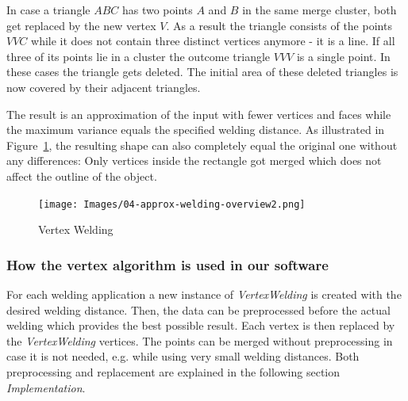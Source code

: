 \documentclass[../ClassicThesis.tex]{subfiles}
\begin{document}
In case a triangle $ABC$ has two points $A$ and $B$ in the same merge cluster, both get replaced by the new vertex $V$. As a result the triangle consists of the points $VVC$ while it does not contain three distinct vertices anymore - it is a line. If all three of its points lie in a cluster the outcome triangle $VVV$ is a single point. In these cases the triangle gets deleted. The initial area of these deleted triangles is now covered by their adjacent triangles.

The result is an approximation of the input with fewer vertices and faces while the maximum variance equals the specified welding distance. As illustrated in Figure~\ref{fig:vertex_welding}, the resulting shape can also completely equal the original one without any differences: Only vertices inside the rectangle got merged which does not affect the outline of the object.



\begin{figure}
\texttt{[image: Images/04-approx-welding-overview2.png]}
\caption{Vertex Welding}
\label{fig:vertex_welding}
\end{figure}

\subsubsection{How the vertex algorithm is used in our software}

For each welding application a new instance of \emph{VertexWelding} is created with the desired welding distance. Then, the data can be preprocessed before the actual welding which provides the best possible result. Each vertex is then replaced by the \emph{VertexWelding} vertices. The points can be merged without preprocessing in case it is not needed, e.g. while using very small welding distances. Both preprocessing and replacement are explained in the following section \emph{Implementation}.




\end{document}
